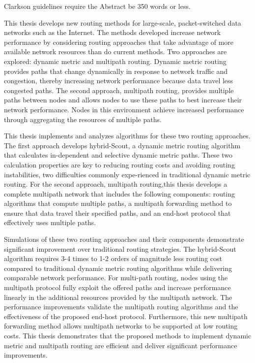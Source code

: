 

Clarkson guidelines require the Abstract be 350 words or less.

This thesis develops new routing methods for large-scale, packet-switched data networks such as the Internet. The methods developed increase network performance by considering routing approaches that take advantage of more available network resources than do current methods. Two approaches are explored: dynamic metric and multipath routing. Dynamic metric routing provides paths that change dynamically in response to network traffic and congestion, thereby increasing network performance because data travel less congested paths. The second approach, multipath routing, provides multiple paths between nodes and allows nodes to use these paths to best increase their network performance. Nodes in this environment achieve increased performance through aggregating the resources of multiple paths.

This thesis implements and analyzes algorithms for these two routing approaches. The first approach develops hybrid-Scout, a dynamic metric routing algorithm that calculates in-dependent and selective dynamic metric paths. These two calculation properties are key to reducing routing costs and avoiding routing instabilities, two difficulties commonly expe-rienced in traditional dynamic metric routing. For the second approach, multipath routing,this thesis develops a complete multipath network that includes the following components: routing algorithms that compute multiple paths, a multipath forwarding method to ensure that data travel their specified paths, and an end-host protocol that effectively uses multiple paths.

Simulations of these two routing approaches and their components demonstrate significant improvement over traditional routing strategies. The hybrid-Scout algorithm requires 3-4 times to 1-2 orders of magnitude less routing cost compared to traditional dynamic metric routing algorithms while delivering comparable network performance. For multi-path routing, nodes using the multipath protocol fully exploit the offered paths and increase performance linearly in the additional resources provided by the multipath network. The performance improvements validate the multipath routing algorithms and the effectiveness of the proposed end-host protocol. Furthermore, this new multipath forwarding method allows multipath networks to be supported at low routing costs. This thesis demonstrates that the proposed methods to implement dynamic metric and multipath routing are efficient
and deliver significant performance improvements.